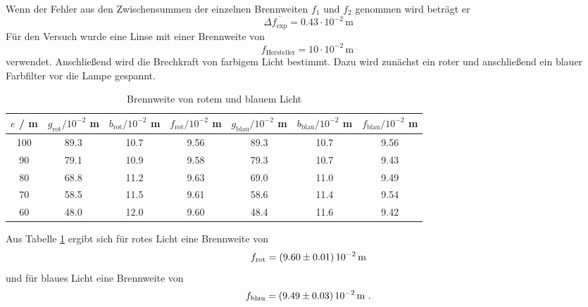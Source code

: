 Wenn der Fehler aus den Zwischensummen der einzelnen Brennweiten $f_1$ und $f_2$ genommen wird beträgt er
\begin{equation}
  \Delta \overline{f_\text{exp}} = 0.43 \cdot 10^{-2} \, \text{m}
  \label{eqn:fehlerkomisch}
\end{equation}
Für den Versuch wurde eine Linse mit einer Brennweite von
\begin{equation}
  f_\text{Hersteller} = 10 \cdot 10^{-2} \, \text{m} \
  \label{eqn:fHer}
\end{equation}
verwendet.
Anschließend wird die Brechkraft von farbigem Licht bestimmt. Dazu wird zunächst ein roter und anschließend ein blauer Farbfilter vor die Lampe gespannt.
\begin{table}
  \centering
  \begin{tabular}{c | c c c || c c c}
    \toprule
    $e$ / m & $g_\text{rot} / 10^{-2}$ m & $b_\text{rot} / 10^{-2}$ m & $f_\text{rot} / 10^{-2}$ m & $g_\text{blau} / 10^{-2}$ m & $b_\text{blau} / 10^{-2}$ m & $f_\text{blau} / 10^{-2}$ m \\
    \midrule
    100	& 89.3	& 10.7	& 9.56&	89.3 & 10.7 & 9.56	\\
    90	& 79.1	& 10.9	& 9.58& 79.3 & 10.7 & 9.43	\\
    80	& 68.8	& 11.2	& 9.63& 69.0 & 11.0 & 9.49	\\
    70	& 58.5	& 11.5	& 9.61& 58.6 & 11.4 & 9.54	\\
    60	& 48.0	& 12.0	& 9.60& 48.4 & 11.6 & 9.42	\\
    \bottomrule
  \end{tabular}
  \caption{Brennweite von rotem und blauem Licht}
  \label{tab:fbesslf}
\end{table}
Aus Tabelle \ref{tab:fbesslf} ergibt sich für rotes Licht eine Brennweite von
\begin{equation}
  f_\text{rot} = (\num{9.60 +- 0.01}) \, 10^{-2} \, \text{m}
  \label{eqn:frot}
\end{equation}
und für blaues Licht eine Brennweite von
\begin{equation}
  f_\text{blau} = (\num{9.49 +- 0.03}) \, 10^{-2} \, \text{m} \ .
  \label{fblau}
\end{equation}

